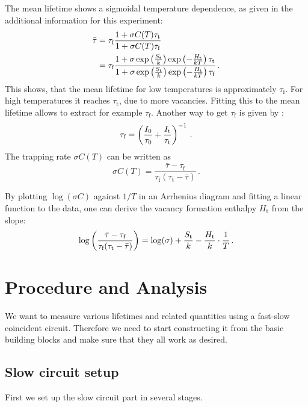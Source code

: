 \documentclass[11pt, english, fleqn, DIV=15, headinclude, BCOR=2cm]{scrreprt}
\begin{document}
The mean lifetime shows a sigmoidal temperature dependence, as given in the
additional information for this experiment:
\begin{align}
    \nonumber
    \bar\tau &= \tau_\text{f} \frac{1 + \sigma C(T) \tau_\text{t}}{1 +
    \sigma C(T) \tau_\text{f}} \\
    \label{eq:temp-model}
    &= \tau_\text{f} \frac{1 + \sigma \exp\left( \frac{S_\text{t}}{k} \right)
    \exp\left( -\frac{H_\mathrm t}{kT} \right) \tau_\text{t}} {1 + \sigma
    \exp\left( \frac{S_\text{t}}{k} \right) \exp\left( -\frac{H_\mathrm t}{kT} \right)
\tau_\text{f}} \,.
\end{align}
This shows, that the mean lifetime for low temperatures is
approximately $\tau_\text{f}$. For high temperatures it reaches
$\tau_\text{t}$, due to more vacancies. Fitting this to the
mean lifetime allows to extract for example $\tau_\text{f}$. 
Another way to get $\tau_\text{f}$ is given by
\textcite[(6)]{Weiler/Vacancy_formation}:
\[
    \tau_\text{f} = \left( \frac{I_0}{\tau_0} +
    \frac{I_\text{t}}{\tau_\text{t}} \right)^{-1} \,.
\]
The trapping rate $\sigma C(T)$ can be written as
\[
    \sigma C(T) = \frac{\bar\tau - \tau_\text{f}}
    {\tau_\text{f}(\tau_\text{t}-\bar\tau)} \,.
\]

By plotting $\log(\sigma C)$ against $1/T$ in an Arrhenius
diagram and fitting a linear function to the data, one can
derive the vacancy formation enthalpy $H_\text{t}$ from the
slope:
\begin{equation}
    \label{eq:arrhenius}
    \log\left( \frac{\bar\tau - \tau_\text{f}}
    {\tau_\text{f}(\tau_\text{t}-\bar\tau)} \right) = \log(\sigma) +
    \frac{S_\text{t}}k - \frac{H_\text{t}}{k}\cdot\frac1T \,.
\end{equation}


\chapter{Procedure and Analysis}

We want to measure various lifetimes and related quantities using a fast-slow
coincident circuit. Therefore we need to start constructing it from the basic
building blocks and make sure that they all work as desired.

\section{Slow circuit setup}

First we set up the slow circuit part in several stages.
\end{document}

